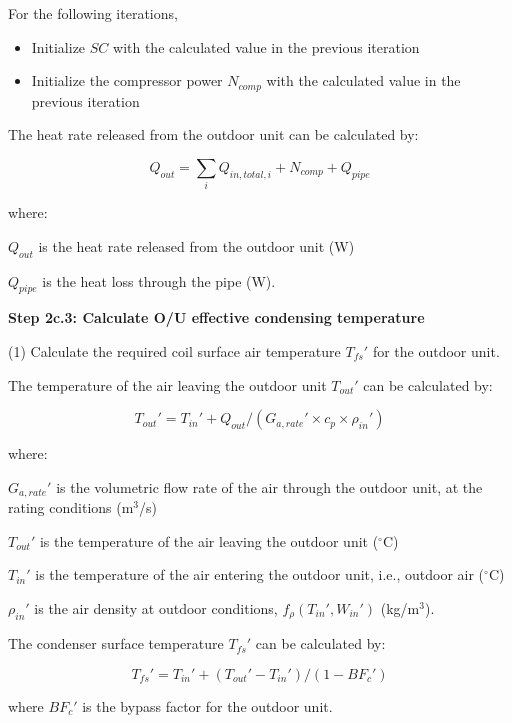 For the following iterations,

\begin{itemize}
\item Initialize $SC$ with the calculated value in the previous iteration
\item Initialize the compressor power $N_{comp}$ with the calculated value in the previous iteration
\end{itemize}

The heat rate released from the outdoor unit can be calculated by:

\begin{equation}Q_{out}=\sum_iQ_{in,total,i}+N_{comp}+Q_{pipe}\end{equation} 

where:

$Q_{out}$ is the heat rate released from the outdoor unit (W)

$Q_{pipe}$ is the heat loss through the pipe (W).

\textbf{Step 2c.3: Calculate O/U effective condensing temperature} 

 (1) Calculate the required coil surface air temperature ${T_{fs}}'$ for the outdoor unit.

The temperature of the air leaving the outdoor unit ${T_{out}}'$ can be calculated by:
 
\begin{equation}{T_{out}}'={T_{in}}'+Q_{out}/({G_{a,rate}}'\times{c_p}\times{{\rho_{in}}'})\end{equation}
 
where:

${G_{a,rate}}'$ is the volumetric flow rate of the air through the outdoor unit, at the rating conditions (m\(^3\)/s)

${T_{out}}'$ is the temperature of the air leaving the outdoor unit (\(^{\circ}\)C)

${T_{in}}'$ is the temperature of the air entering the outdoor unit, i.e., outdoor air (\(^{\circ}\)C)

${\rho_{in}}'$ is the air density at outdoor conditions, $f_{\rho}({T_{in}}',{W_{in}}')$ (kg/m\(^3\)).

The condenser surface temperature ${T_{fs}}'$ can be calculated by:
 
\begin{equation}{T_{fs}}'={T_{in}}'+({T_{out}}'-{T_{in}}')/(1-{BF_c}')\end{equation}
 
where ${BF_c}'$ is the bypass factor for the outdoor unit.

